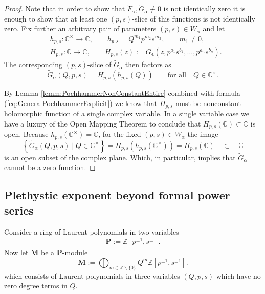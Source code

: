 \documentclass{amsart}
\begin{document}
\begin{proof}
Note that in order to show that $\widetilde F_\alpha,\widetilde G_\alpha\not\equiv0$ is not identically zero it is enough to show that at least one $(p,s)$-slice of this functions is not identically zero. Fix further an arbitrary pair of parameters $(p,s)\in W_\alpha$ and let
\begin{align*}
&h_{p,s}:\mathbb C^\times\rightarrow\mathbb C,\qquad h_{p,s}=Q^{m_1}p^{m_2}s^{m_3},\qquad m_1\neq0,\\
&H_{p,s}:\mathbb C\rightarrow\mathbb C,\qquad H_{p,s}(z):=G_{\boldsymbol\epsilon}(z,p^{a_1}s^{b_1},\dots,p^{a_n}s^{b_n}).
\end{align*}
The corresponding $(p,s)$-slice of $\widetilde G_{\alpha}$ then factors as
\begin{equation}
    \widetilde G_\alpha(Q,p,s)=H_{p,s}(h_{p,s}(Q))\qquad\textrm{for all}\quad Q\in\mathbb C^\times.
    \label{eq:psSliceGEpsilon}
\end{equation}

By Lemma \ref{lemm:PochhammerNonConstantEntire} combined with formula (\ref{eq:GeneralPochhammerExplicit}) we know that $H_{p,s}$ must be nonconstant holomorphic function of a single complex variable. In a single variable case we have a luxury of the Open Mapping Theorem to conclude that $H_{p,s}(\mathbb C)\subset\mathbb C$ is open. Because $h_{p,s}(\mathbb C^\times)=\mathbb C$, for the fixed $(p,s)\in W_\alpha$ the image
\begin{equation*}
\left\{\widetilde{G}_\alpha(Q,p,s)\;\big|\;Q\in\mathbb C^\times\right\}=H_{p,s}(h_{p,s}(\mathbb C^\times))=H_{p,s}(\mathbb C)\quad\subset\quad\mathbb C
\end{equation*}
is an open subset of the complex plane. Which, in particular, implies that $\widetilde{G}_\alpha$ cannot be a zero function.
\end{proof}

\subsection{Plethystic exponent beyond formal power series}

Consider a ring of Laurent polynomials in two variables
\begin{equation*}
\mathbf P:=\mathbb Z[p^{\pm1},s^{\pm}].
\end{equation*}
Now let $\mathbf M$ be a $\mathbf P$-module
\begin{equation*}
\mathbf M:=\bigoplus_{m\in\mathbb Z\backslash\{0\}}Q^m\mathbb Z[p^{\pm1},s^{\pm1}].
\end{equation*}
which consists of Laurent polynomials in three variables $(Q,p,s)$ which have no zero degree terms in $Q$.
\end{document}
